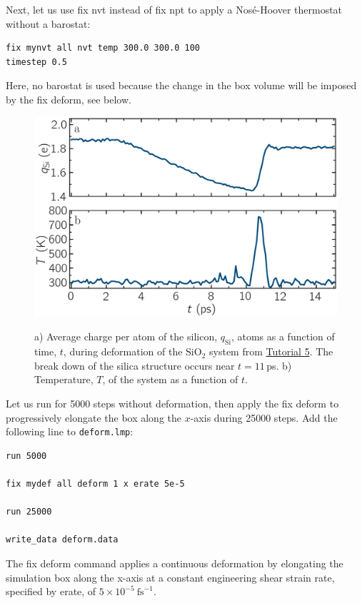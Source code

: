 \documentclass[9pt,tutorial]{livecoms}
\newcommand{\lmpcmd}[1]{\colorbox{listing}{\textcolor{command}{\small{#1}}}} %
\newcommand{\flecmd}[1]{\textcolor{command}{\texttt{#1}}} %
\begin{document}
Next, let us use \lmpcmd{fix nvt} instead of \lmpcmd{fix npt} to apply a
Nosé-Hoover thermostat without a barostat:
\begin{lstlisting}
fix mynvt all nvt temp 300.0 300.0 100
timestep 0.5
\end{lstlisting}
Here, no barostat is used because the change in the box volume will be imposed
by the \lmpcmd{fix deform}, {\color{blue}see below}.

\begin{figure}
\includegraphics[width=\linewidth]{SIO-deformed-charge}\\[-4ex]
\caption{a) Average charge per atom of the silicon, $q_\text{Si}$, atoms as
a function of time, $t$, during deformation of the $\text{SiO}_2$ system
from \hyperref[reactive-silicon-dioxide-label]{Tutorial 5}. The break down of the
silica structure occurs near $t = 11$\,ps.  b) Temperature, $T$, of the
system as a function of $t$.}
\label{fig:SIO-deformed-charge}
\end{figure}

Let us run for 5000 steps without deformation, then apply the \lmpcmd{fix deform}
to progressively elongate the box along the $x$-axis during 25000 steps.  Add
the following line to \flecmd{deform.lmp}:
\begin{lstlisting}
run 5000

fix mydef all deform 1 x erate 5e-5

run 25000

write_data deform.data
\end{lstlisting}
{\color{blue}The \lmpcmd{fix deform} command applies a continuous deformation
by elongating the simulation box along the x-axis at a constant engineering
shear strain rate, specified by \lmpcmd{erate}, of $5 \times 10^{-5}~\text{fs}^{-1}$.}
\end{document}
